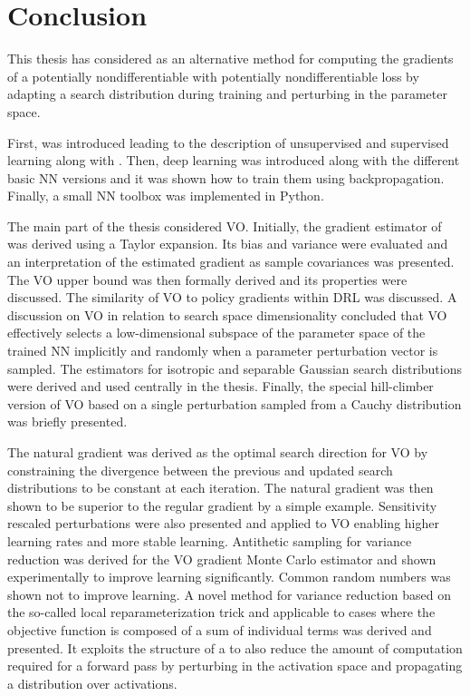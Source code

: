 
\chapter{Conclusion}\label{chp: Conclusion}

This thesis has considered  as an alternative method for computing the gradients of a potentially nondifferentiable  with potentially nondifferentiable loss by adapting a search distribution during training and perturbing in the parameter space. 

First,  was introduced leading to the description of unsupervised and supervised learning along with . Then, deep learning was introduced along with the different basic \gls{NN} versions and it was shown how to train them using backpropagation. Finally, a small \gls{NN} toolbox was implemented in Python.

The main part of the thesis considered \gls{VO}. Initially, the gradient estimator of \cite{Salimans2017} was derived using a Taylor expansion. Its bias and variance were evaluated and an interpretation of the estimated gradient as sample covariances was presented.
The \gls{VO} upper bound was then formally derived and its properties were discussed. The similarity of \gls{VO} to policy gradients within \gls{DRL} was discussed. 
A discussion on \gls{VO} in relation to search space dimensionality concluded that \gls{VO} effectively selects a low-dimensional subspace of the parameter space of the trained \gls{NN} implicitly and randomly when a parameter perturbation vector is sampled.
The estimators for isotropic and separable Gaussian search distributions were derived and used centrally in the thesis. Finally, the special hill-climber version of \gls{VO} based on a single perturbation sampled from a Cauchy distribution was briefly presented.

The natural gradient was derived as the optimal search direction for \gls{VO} by constraining the  divergence between the previous and updated search distributions to be constant at each iteration. The natural gradient was then shown to be superior to the regular gradient by a simple example.
Sensitivity rescaled perturbations were also presented and applied to \gls{VO} enabling higher learning rates and more stable learning. 
Antithetic sampling for variance reduction was derived for the \gls{VO} gradient Monte Carlo estimator and shown experimentally to improve learning significantly. 
Common random numbers was shown not to improve learning. 
A novel method for variance reduction based on the so-called local reparameterization trick and applicable to cases where the objective function is composed of a sum of individual terms was derived and presented. It exploits the structure of a  to also reduce the amount of computation required for a forward pass by perturbing in the activation space and propagating a distribution over activations. 

